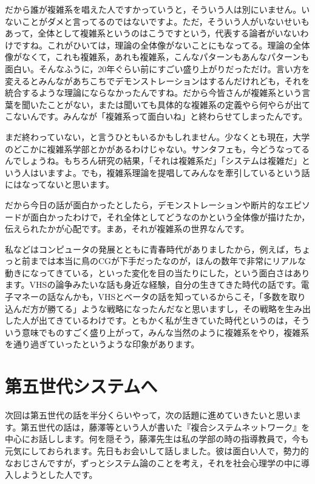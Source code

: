 \documentclass{ltjsbook}
\begin{document}
だから誰が複雑系を唱えた人ですかっていうと，そういう人は別にいません。いないことがダメと言ってるのではないですよ。ただ，そういう人がいないせいもあって，全体として複雑系というのはこうですという，代表する論者がいないわけですね。これがひいては，理論の全体像がないことにもなってる。理論の全体像がなくて，これも複雑系，あれも複雑系，こんなパターンもあんなパターンも面白い。そんなふうに，20年ぐらい前にすごい盛り上がりだっただけ。言い方を変えるとみんながあちこちでデモンストレーションはするんだけれども，それを統合するような理論にならなかったんですね。だから今皆さんが複雑系という言葉を聞いたことがない，または聞いても具体的な複雑系の定義やら何やらが出てこないんです。みんなが「複雑系って面白いね」と終わらせてしまったんです。

まだ終わっていない，と言うひともいるかもしれません。少なくとも現在，大学のどこかに複雑系学部とかがあるわけじゃない。サンタフェも，今どうなってるんでしょうね。もちろん研究の結果，「それは複雑系だ」「システムは複雑だ」という人はいますよ。でも，複雑系理論を提唱してみんなを牽引しているという話にはなってないと思います。

だから今日の話が面白かったとしたら，デモンストレーションや断片的なエピソードが面白かったわけで，それ全体としてどうなのかという全体像が描けたか，伝えられたかが心配です。まあ，それが複雑系の世界なんです。

私などはコンピュータの発展とともに青春時代がありましたから，例えば，ちょっと前までは本当に鳥のCGが下手だったなのが，ほんの数年で非常にリアルな動きになってきている，といった変化を目の当たりにした，という面白さはあります。VHSの論争みたいな話も身近な経験，自分の生きてきた時代の話です。電子マネーの話なんかも，VHSとベータの話を知っているからこそ，「多数を取り込んだ方が勝てる」ような戦略になったんだなと思いますし，その戦略を生み出した人が出てきているわけです。ともかく私が生きていた時代というのは，そういう意味でものすごく盛り上がって，みんな当然のように複雑系をやり，複雑系を通り過ぎていったというような印象があります。

\section{第五世代システムへ}

次回は第五世代の話を半分くらいやって，次の話題に進めていきたいと思います。第五世代の話は，藤澤等という人が書いた『複合システムネットワーク』\parencite{fujisawaNetwork}を中心にお話しします。何を隠そう，藤澤先生は私の学部の時の指導教員で，今も元気にしておられます。先日もお会いして話しました。彼は面白い人で，勢力的なおじさんですが，ずっとシステム論のことを考え，それを社会心理学の中に導入しようとした人です。
\end{document}
